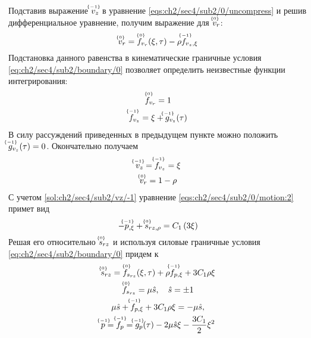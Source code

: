 Подставив выражение $\uindex{v}{-1}_{z}$ в уравнение \cref{eqs:ch2/sec4/sub2/0/uncompress} и решив дифференциальное уравнение, получим выражение для $\uindex{v}{0}_{r}$:
\begin{equation*}
  \uindex{v}{0}_{r} = \uindex{f}{0}_{v_{r}}(\xi, \tau) -\rho \uindex{f}{-1}_{v_{z},\xi}
\end{equation*}
Подстановка данного равенства в кинематические граничные условия \cref{eq:ch2/sec4/sub2/boundary/0} позволяет определить неизвестные функции интегрирования:
\begin{gather*}
  \uindex{f}{0}_{v_{r}} = 1
  \\
  \uindex{f}{-1}_{v_{z}} = \xi + \uindex{g}{-1}_{v_{z}}(\tau)
\end{gather*}
В силу рассуждений приведенных в предыдущем пункте можно положить $\uindex{g}{-1}_{v_{z}}(\tau) = 0$. Окончательно получаем
\begin{gather}
  \label{sol:ch2/sec4/sub2/vz/-1}
  \uindex{v}{-1}_{z} = \uindex{f}{-1}_{v_{z}} = \xi
  \\
  \label{sol:ch2/sec4/sub2/vr/0}
  \uindex{v}{0}_{r} =  1 - \rho
\end{gather}
С учетом \cref{sol:ch2/sec4/sub2/vz/-1} уравнение \cref{eqs:ch2/sec4/sub2/0/motion:2} примет вид
\begin{equation*}
  -\uindex{p}{-1}_{,\xi} + \uindex{s}{0}_{rz,\rho} = C_1 \left(3 \xi \right)
\end{equation*}
Решая его относительно $\uindex{s}{0}_{rz}$ и используя силовые граничные условия \cref{eq:ch2/sec4/sub2/boundary/0} придем к
\begin{gather*}
  \uindex{s}{0}_{rz} = \uindex{f}{0}_{s_{rz}}(\xi, \tau) + \rho \uindex{f}{-1}_{p,\xi} + 3 C_1 \rho \xi
  \\
  \uindex{f}{0}_{s_{rz}} = \mu\hat{s}, \quad \hat{s} = \pm 1
  \\
  \mu\hat{s} +\uindex{f}{-1}_{p,\xi} + 3 C_1 \rho \xi = -\mu \hat{s},
  \\
  \uindex{p}{-1}=\uindex{f}{-1}_{p} =\uindex{g}{-1}_{p}(\tau) -2\mu\hat{s}\xi - \frac{3 C_1}{2}\xi^2
\end{gather*}

